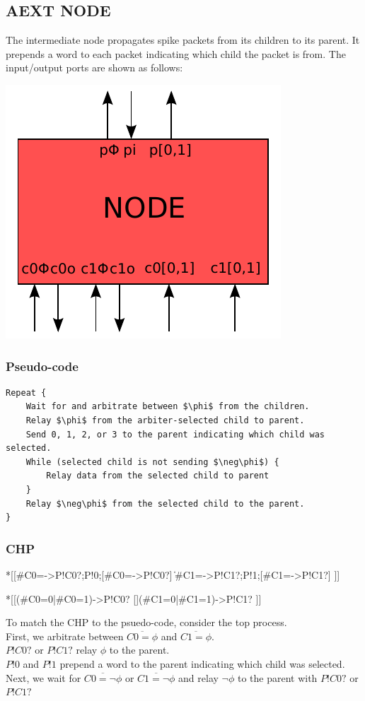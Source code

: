\documentclass{article}
\begin{document}
\subsection{AEXT NODE \label{sec:AEXT_NODE}}

The intermediate node propagates spike packets from its children to its parent.
It prepends a word to each packet indicating which child the packet is from. 
The input/output ports are shown as follows:

\begin{center}
  \includegraphics[width=.25\textwidth]{img/aext_node.pdf}
\end{center}

\subsubsection*{Pseudo-code}

\begin{lstlisting}[mathescape]
Repeat {
    Wait for and arbitrate between $\phi$ from the children.
    Relay $\phi$ from the arbiter-selected child to parent.
    Send 0, 1, 2, or 3 to the parent indicating which child was selected.
    While (selected child is not sending $\neg\phi$) {
        Relay data from the selected child to parent
    }
    Relay $\neg\phi$ from the selected child to the parent.
}
\end{lstlisting}

\subsubsection*{CHP}

\begin{csp}
*[[#{C0=\phi}->P!C0?;P!0;[#{C0=\neg\phi}->P!C0?]
  \|#{C1=\phi}->P!C1?;P!1;[#{C1=\neg\phi}->P!C1?]
 ]]

*[[(#{C0=0}|#{C0=1})->P!C0?
  [](#{C1=0}|#{C1=1})->P!C1?
 ]]
\end{csp}

\noindent
To match the CHP to the psuedo-code, consider the top process. \\
First, we arbitrate between $\overline{C0=\phi}$ and 
$\overline{C1=\phi}$. \\
$P!C0?$ or $P!C1?$ relay $\phi$ to the parent. \\
$P!0$ and $P!1$ prepend a word to the parent indicating which child was 
selected. \\
Next, we wait for $\overline{C0=\neg\phi}$ or $\overline{C1=\neg\phi}$ 
and relay $\neg\phi$ to the parent with $P!C0?$ or $P!C1?$ \\
\end{document}
